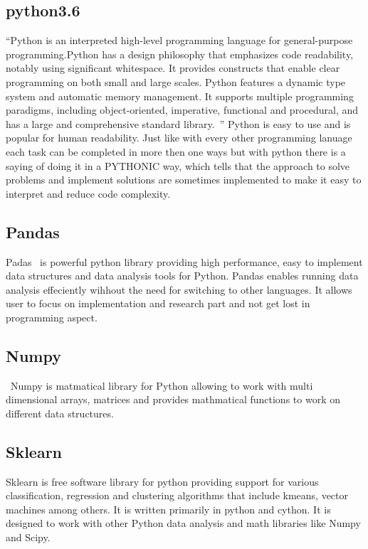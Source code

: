 \subsection{python3.6}
``Python is an interpreted high-level programming language for
general-purpose programming.Python has a design philosophy that
emphasizes code readability, notably using significant whitespace. It
provides constructs that enable clear programming on both small and
large scales. Python features a dynamic type system and automatic
memory management. It supports multiple programming paradigms,
including object-oriented, imperative, functional and procedural, and
has a large and comprehensive standard
library.~\cite{hid-sp18-413-python}'' Python is easy to use and is
popular for human readability. Just like with every other programming
lanuage each task can be completed in more then one ways but with
python there is a saying of doing it in a PYTHONIC way, which tells
that the approach to solve problems and implement solutions are
sometimes implemented to make it easy to interpret and reduce code
complexity.

\subsection{Pandas}

Padas~\cite{hid-sp18-413-pandas} is powerful python library providing
high performance, easy to implement data structures and data analysis
tools for Python. Pandas enables running data analysis effeciently
wihhout the need for switching to other languages. It allows user to
focus on implementation and research part and not get lost in
programming aspect.

\subsection{Numpy}
~\cite{}Numpy is matmatical library for Python allowing to work with multi
dimensional arrays, matrices and provides mathmatical functions to
work on different data structures. 

\subsection{Sklearn}
Sklearn is free software library for python providing support for
various classification, regression and clustering algorithms that
include kmeans, vector machines among others. It is written primarily
in python and cython. It is designed to work with other Python data
analysis and math libraries like Numpy and Scipy.


